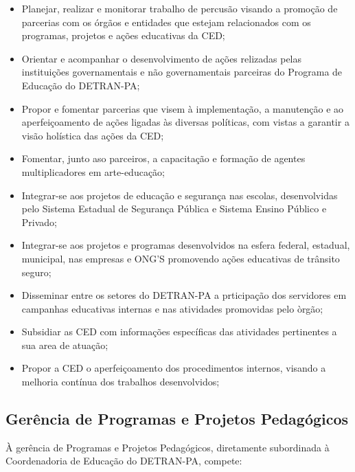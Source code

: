\documentclass[a4paper]{article}
\begin{document}
\begin{itemize}
\item Planejar, realizar e monitorar trabalho de percusão visando a promoção de parcerias com os órgãos e entidades que estejam relacionados com os programas, projetos e ações educativas da CED;
\item Orientar e acompanhar o desenvolvimento de ações relizadas pelas instituições governamentais e não governamentais parceiras do Programa de Educação do DETRAN-PA;
\item Propor e fomentar parcerias que visem à implementação, a manutenção e ao aperfeiçoamento de ações ligadas às diversas políticas, com vistas a garantir a visão holística das ações da CED;
\item Fomentar, junto aso parceiros, a capacitação e formação de agentes multiplicadores em arte-educação;
\item Integrar-se aos projetos de educação e segurança nas escolas, desenvolvidas pelo Sistema Estadual de Segurança Pública e Sistema Ensino Público e Privado;
\item Integrar-se aos projetos e programas desenvolvidos na esfera federal, estadual, municipal, nas empresas e ONG’S promovendo ações educativas de trânsito seguro;
\item Disseminar entre os setores do DETRAN-PA a prticipação dos servidores em campanhas educativas internas e nas atividades promovidas pelo òrgão;
\item Subsidiar as CED com informações específicas das atividades pertinentes a sua area de atuação;
\item Propor a CED o aperfeiçoamento dos procedimentos internos, visando a melhoria contínua dos trabalhos desenvolvidos;
\end{itemize}


\subsection{Gerência de Programas e Projetos Pedagógicos}

À gerência de Programas e Projetos Pedagógicos, diretamente subordinada à Coordenadoria de Educação do DETRAN-PA, compete:
\vskip0.3cm 
\end{document}
